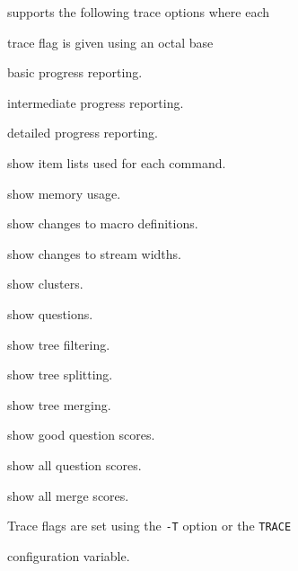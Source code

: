  supports the following trace options where each


trace flag is given using an octal base


\begin{optlist}


    basic progress reporting.


    intermediate progress reporting.


    detailed progress reporting.


    show item lists used for each command.


    show memory usage.


    show changes to macro definitions.


    show changes to stream widths.


    show clusters.


    show questions.


    show tree filtering.


    show tree splitting.


    show tree merging.


    show good question scores.


    show all question scores.


    show all merge scores.


\end{optlist}


Trace flags are set using the \texttt{-T} option or the  \texttt{TRACE} 


configuration variable.


















